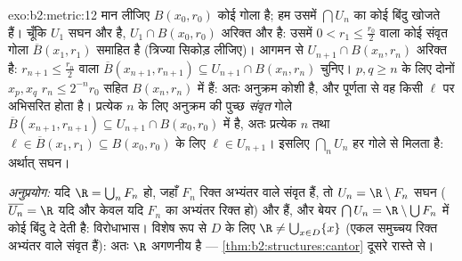 \begin{solution}{exo:b2:metric:12}
मान लीजिए $B(x_0, r_0)$ कोई गोला है; हम उसमें $\bigcap U_n$ का कोई बिंदु खोजते हैं। चूँकि
$U_1$ सघन और  है, $U_1 \cap B(x_0, r_0)$ अरिक्त और  है: उसमें $0 < r_1 \leq \frac{r_0}2$ वाला कोई संवृत
गोला $\overline B(x_1,
r_1)$ समाहित है (त्रिज्या सिकोड़ लीजिए)। आगमन से $U_{n+1} \cap B(x_n, r_n)$ अरिक्त 
है: $r_{n+1} \leq \frac{r_n}2$ वाला $\overline B(x_{n+1}, r_{n+1}) \subseteq U_{n+1} \cap B(x_n,
r_n)$ चुनिए। $p, q \geq n$ के लिए दोनों $x_p, x_q$ $r_n \leq 2^{-n}r_0$ सहित $B(x_n, r_n)$ में हैं:
अतः अनुक्रम कोशी है, और पूर्णता से वह किसी $\ell$ पर अभिसरित होता है।
प्रत्येक $n$ के लिए अनुक्रम की पुच्छ \emph{संवृत} गोले $\overline B(x_{n+1}, r_{n+1}) \subseteq U_{n+1}
\cap B(x_0, r_0)$ में है,
अतः प्रत्येक $n$ तथा $\ell
\in \overline B(x_1, r_1) \subseteq B(x_0, r_0)$ के लिए $\ell \in U_{n+1}$। इसलिए $\bigcap_n U_n$ हर गोले से मिलता
है: अर्थात् सघन।

\emph{अनुप्रयोग:} यदि $\R = \bigcup_n F_n$ हो, जहाँ $F_n$ रिक्त अभ्यंतर वाले संवृत हैं,
तो $U_n = \R \setminus F_n$ सघन ($\overline{U_n} = \R$ यदि और केवल यदि $F_n$ का अभ्यंतर रिक्त हो) और  हैं,
और बेयर $\bigcap U_n = \R \setminus \bigcup
F_n$ में कोई बिंदु दे देती है: विरोधाभास। विशेष रूप से  $D$
के लिए $\R \neq \bigcup_{x \in D}
\{x\}$ (एकल समुच्चय रिक्त अभ्यंतर वाले संवृत हैं): अतः $\R$ अगणनीय
है --- \cref{thm:b2:structures:cantor} दूसरे रास्ते से।
\end{solution}

